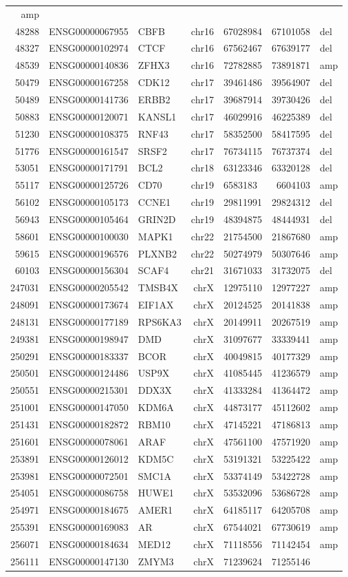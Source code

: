 \documentclass[]{article}
\begin{document}
\begin{longtable}[]{@{}rrlrlrl@{}}
amp\tabularnewline
48288 & ENSG00000067955 & CBFB & chr16 & 67028984 & 67101058 &
del\tabularnewline
48327 & ENSG00000102974 & CTCF & chr16 & 67562467 & 67639177 &
del\tabularnewline
48539 & ENSG00000140836 & ZFHX3 & chr16 & 72782885 & 73891871 &
amp\tabularnewline
50479 & ENSG00000167258 & CDK12 & chr17 & 39461486 & 39564907 &
del\tabularnewline
50489 & ENSG00000141736 & ERBB2 & chr17 & 39687914 & 39730426 &
del\tabularnewline
50883 & ENSG00000120071 & KANSL1 & chr17 & 46029916 & 46225389 &
del\tabularnewline
51230 & ENSG00000108375 & RNF43 & chr17 & 58352500 & 58417595 &
del\tabularnewline
51776 & ENSG00000161547 & SRSF2 & chr17 & 76734115 & 76737374 &
del\tabularnewline
53051 & ENSG00000171791 & BCL2 & chr18 & 63123346 & 63320128 &
del\tabularnewline
55117 & ENSG00000125726 & CD70 & chr19 & 6583183 & 6604103 &
amp\tabularnewline
56102 & ENSG00000105173 & CCNE1 & chr19 & 29811991 & 29824312 &
del\tabularnewline
56943 & ENSG00000105464 & GRIN2D & chr19 & 48394875 & 48444931 &
del\tabularnewline
58601 & ENSG00000100030 & MAPK1 & chr22 & 21754500 & 21867680 &
amp\tabularnewline
59615 & ENSG00000196576 & PLXNB2 & chr22 & 50274979 & 50307646 &
amp\tabularnewline
60103 & ENSG00000156304 & SCAF4 & chr21 & 31671033 & 31732075 &
del\tabularnewline
247031 & ENSG00000205542 & TMSB4X & chrX & 12975110 & 12977227 &
amp\tabularnewline
248091 & ENSG00000173674 & EIF1AX & chrX & 20124525 & 20141838 &
amp\tabularnewline
248131 & ENSG00000177189 & RPS6KA3 & chrX & 20149911 & 20267519 &
amp\tabularnewline
249381 & ENSG00000198947 & DMD & chrX & 31097677 & 33339441 &
amp\tabularnewline
250291 & ENSG00000183337 & BCOR & chrX & 40049815 & 40177329 &
amp\tabularnewline
250501 & ENSG00000124486 & USP9X & chrX & 41085445 & 41236579 &
amp\tabularnewline
250551 & ENSG00000215301 & DDX3X & chrX & 41333284 & 41364472 &
amp\tabularnewline
251001 & ENSG00000147050 & KDM6A & chrX & 44873177 & 45112602 &
amp\tabularnewline
251431 & ENSG00000182872 & RBM10 & chrX & 47145221 & 47186813 &
amp\tabularnewline
251601 & ENSG00000078061 & ARAF & chrX & 47561100 & 47571920 &
amp\tabularnewline
253891 & ENSG00000126012 & KDM5C & chrX & 53191321 & 53225422 &
amp\tabularnewline
253981 & ENSG00000072501 & SMC1A & chrX & 53374149 & 53422728 &
amp\tabularnewline
254051 & ENSG00000086758 & HUWE1 & chrX & 53532096 & 53686728 &
amp\tabularnewline
254971 & ENSG00000184675 & AMER1 & chrX & 64185117 & 64205708 &
amp\tabularnewline
255391 & ENSG00000169083 & AR & chrX & 67544021 & 67730619 &
amp\tabularnewline
256071 & ENSG00000184634 & MED12 & chrX & 71118556 & 71142454 &
amp\tabularnewline
256111 & ENSG00000147130 & ZMYM3 & chrX & 71239624 & 71255146 &

\end{longtable}
\end{document}
